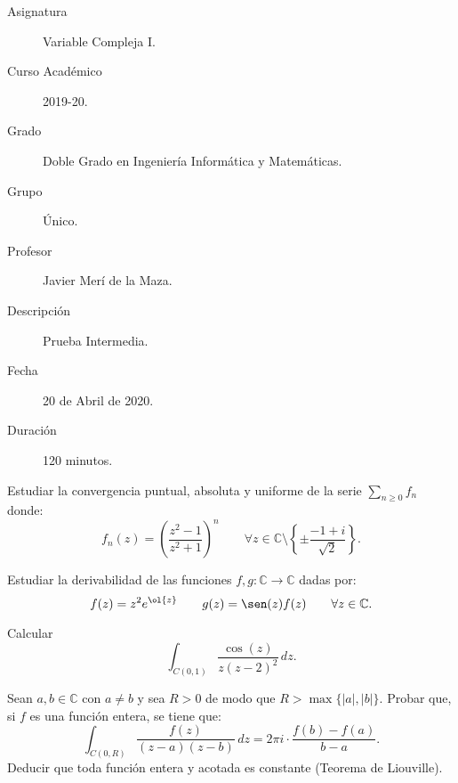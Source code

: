\documentclass[12pt]{article}
\begin{document}

    
    

    \begin{description}
        \item[Asignatura] Variable Compleja I.
        \item[Curso Académico] 2019-20.
        \item[Grado] Doble Grado en Ingeniería Informática y Matemáticas.
        \item[Grupo] Único.
        \item[Profesor] Javier Merí de la Maza.
        \item[Descripción] Prueba Intermedia.
        \item[Fecha] 20 de Abril de 2020.
        \item[Duración] 120 minutos.
    \end{description}
    \newpage

    \begin{ejercicio}[3 puntos]
        Estudiar la convergencia puntual, absoluta y uniforme de la serie $\sum\limits_{n \geq 0} f_n$ donde:
        \[
            f_n(z) = \left(\dfrac{z^2-1}{z^2+1}\right)^n\qquad \forall z \in \mathbb{C} \setminus \left\{\pm \dfrac{-1+i}{\sqrt{2}}\right\}.
        \]
    \end{ejercicio}

    \begin{ejercicio}[3 puntos]
        Estudiar la derivabilidad de las funciones $f,g : \mathbb{C} \to \mathbb{C}$ dadas por:
        \[
            f(z) = z^2 e^{\ol{z}}
            \qquad g(z) = \sen(z) f(z) \qquad \forall z \in \mathbb{C}.
        \]
    \end{ejercicio}

    \begin{ejercicio}[1 punto]
        Calcular
        \[
            \int_{C(0,1)} \dfrac{\cos(z)}{z(z-2)^2} \, dz.
        \]
    \end{ejercicio}

    \begin{ejercicio}[3 puntos]
        Sean $a,b \in \mathbb{C}$ con $a \neq b$ y sea $R > 0$ de modo que $R > \max\{|a|,|b|\}$. Probar que, si $f$ es una función entera, se tiene que:
        \[
            \int_{C(0,R)} \dfrac{f(z)}{(z-a)(z-b)} \, dz = 2\pi i \cdot \dfrac{f(b) - f(a)}{b-a}.
        \]
        Deducir que toda función entera y acotada es constante (Teorema de Liouville).
    \end{ejercicio}
\end{document}
